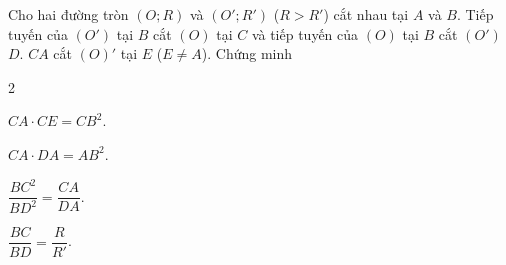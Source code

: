 	
\begin{bt}%
	Cho hai đường tròn $(O;R)$ và $(O';R')$ ($R>R'$) cắt nhau tại $A$ và $B$. Tiếp tuyến của $(O')$ tại $B$ cắt $(O)$ tại $C$ và tiếp tuyến của $(O)$ tại $B $ cắt $(O')$ $D$. $CA$ cắt $(O)'$ tại $E$ ($E \neq A$). Chứng minh
	\begin{enumerate}
	\end{enumerate}
	\loigiai{
		
}
\end{bt}
